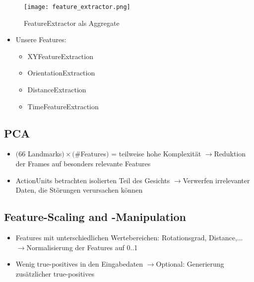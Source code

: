 \documentclass{beamer}
\begin{document}
\begin{frame}
\begin{figure}
    \texttt{[image: feature\_extractor.png]}
    \caption{FeatureExtractor als Aggregate}
    \end{figure}
\end{frame}

\begin{frame}
\begin{itemize}
  \item Unsere Features:
    \begin{itemize}
      \item XYFeatureExtraction
      \item OrientationExtraction
      \item DistanceExtraction
      \item TimeFeatureExtraction
    \end{itemize}
  \end{itemize}
\end{frame}

\subsection{PCA}
\begin{frame}
  \begin{itemize}
    \item $($66 Landmarks$) \times ($\#Features$)$ = teilweise hohe Komplexität\newline
          $\rightarrow$Reduktion der Frames auf besonders relevante Features
    \item ActionUnits betrachten isolierten Teil des Gesichts\newline
          $\rightarrow$Verwerfen irrelevanter Daten, die Störungen verursachen können
  \end{itemize}
\end{frame}

\subsection{Feature-Scaling and -Manipulation}
\begin{frame}
  \begin{itemize}
    \item Features mit unterschiedlichen Wertebereichen: Rotationsgrad, Distance,...\newline
          $\rightarrow$Normalisierung der Features auf 0..1
    \item Wenig true-positives in den Eingabedaten\newline
          $\rightarrow$Optional: Generierung zusätzlicher true-positives
  \end{itemize}
\end{frame}
\end{document}
